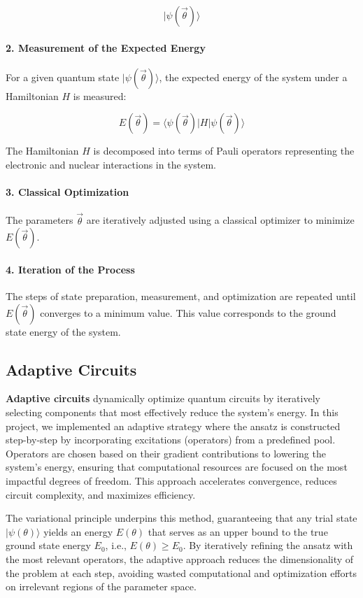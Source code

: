 \[
|\psi(\vec{\theta})\rangle
\]

\paragraph{2. Measurement of the Expected Energy}

For a given quantum state \(|\psi(\vec{\theta})\rangle\), the expected energy of the system under a Hamiltonian \(H\) is measured:

\[
E(\vec{\theta}) = \langle \psi(\vec{\theta}) | H | \psi(\vec{\theta}) \rangle
\]

The Hamiltonian \(H\) is decomposed into terms of Pauli operators representing the electronic and nuclear interactions in the system.

\paragraph{3. Classical Optimization}

The parameters \(\vec{\theta}\) are iteratively adjusted using a classical optimizer to minimize \(E(\vec{\theta})\).

\paragraph{4. Iteration of the Process}

The steps of state preparation, measurement, and optimization are repeated until \(E(\vec{\theta})\) converges to a minimum value. This value corresponds to the ground state energy of the system.

\subsection{Adaptive Circuits}

\textbf{Adaptive circuits} dynamically optimize quantum circuits by iteratively selecting components that most effectively reduce the system's energy. In this project, we implemented an adaptive strategy where the ansatz is constructed step-by-step by incorporating excitations (operators) from a predefined pool. Operators are chosen based on their gradient contributions to lowering the system's energy, ensuring that computational resources are focused on the most impactful degrees of freedom. This approach accelerates convergence, reduces circuit complexity, and maximizes efficiency.

The variational principle underpins this method, guaranteeing that any trial state $|\psi(\theta)\rangle$ yields an energy $E(\theta)$ that serves as an upper bound to the true ground state energy $E_0$, i.e., $E(\theta) \ge E_0$. By iteratively refining the ansatz with the most relevant operators, the adaptive approach reduces the dimensionality of the problem at each step, avoiding wasted computational and optimization efforts on irrelevant regions of the parameter space.

